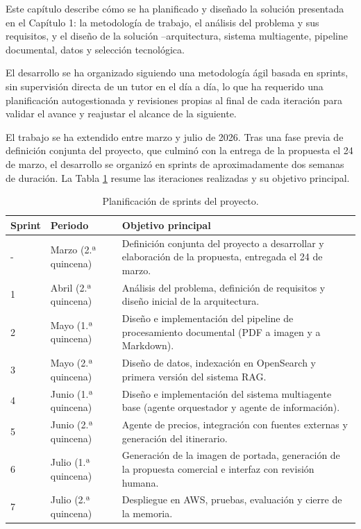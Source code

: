 \clearpage
{}

Este capítulo describe cómo se ha planificado y diseñado la solución presentada en el Capítulo 1: la metodología de trabajo, el análisis del problema y sus requisitos, y el diseño de la solución --arquitectura, sistema multiagente, pipeline documental, datos y selección tecnológica.

El desarrollo se ha organizado siguiendo una metodología ágil basada en sprints, sin supervisión directa de un tutor en el día a día, lo que ha requerido una planificación autogestionada y revisiones propias al final de cada iteración para validar el avance y reajustar el alcance de la siguiente.

El trabajo se ha extendido entre marzo y julio de 2026. Tras una fase previa de definición conjunta del proyecto, que culminó con la entrega de la propuesta el 24 de marzo, el desarrollo se organizó en sprints de aproximadamente dos semanas de duración. La Tabla \ref{tab:sprints} resume las iteraciones realizadas y su objetivo principal.

\begin{table}[h!]
\centering
\begin{tabular}{@{}p{2.2cm}p{3.2cm}p{8.5cm}@{}}
\toprule
\textbf{Sprint} & \textbf{Periodo} & \textbf{Objetivo principal} \\
\midrule
- & Marzo (2.ª quincena) & Definición conjunta del proyecto a desarrollar y elaboración de la propuesta, entregada el 24 de marzo. \\
1 & Abril (2.ª quincena) & Análisis del problema, definición de requisitos y diseño inicial de la arquitectura. \\
2 & Mayo (1.ª quincena) & Diseño e implementación del pipeline de procesamiento documental (PDF a imagen y a Markdown). \\
3 & Mayo (2.ª quincena) & Diseño de datos, indexación en OpenSearch y primera versión del sistema RAG. \\
4 & Junio (1.ª quincena) & Diseño e implementación del sistema multiagente base (agente orquestador y agente de información). \\
5 & Junio (2.ª quincena) & Agente de precios, integración con fuentes externas y generación del itinerario. \\
6 & Julio (1.ª quincena) & Generación de la imagen de portada, generación de la propuesta comercial e interfaz con revisión humana. \\
7 & Julio (2.ª quincena) & Despliegue en AWS, pruebas, evaluación y cierre de la memoria. \\
\bottomrule
\end{tabular}
\caption{Planificación de sprints del proyecto.}
\label{tab:sprints}
\end{table}

